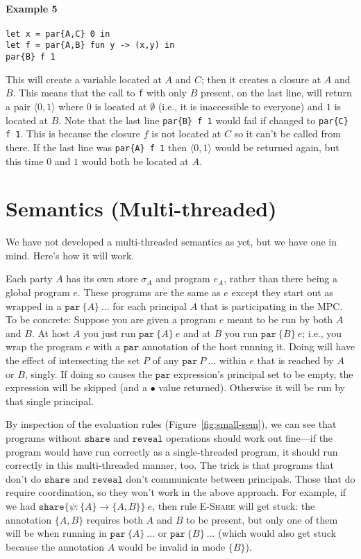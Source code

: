 \documentclass[10pt]{article}
\newcommand{\rulelab}[1]{{\small \textsc{#1}}}
\newcommand{\kw}[1]{\ensuremath{\mathtt{#1}}}
\newcommand{\epar}[2]{\ensuremath{\kw{par}~{#1}~{#2}}}
\newcommand{\eshare}[4]{\ensuremath{\kw{share}\{{#1}\!:\!{#2}\rightarrow{#3}\}~{#4}}}
\newcommand{\epair}[2]{\ensuremath{\langle {#1}, {#2} \rangle}}
\newcommand{\vcrash}{\ensuremath{\bullet}}
\newcommand{\env}{\ensuremath{\sigma}}
\begin{document}
\paragraph{Example 5}
\begin{verbatim}
let x = par{A,C} 0 in
let f = par{A,B} fun y -> (x,y) in
par{B} f 1
\end{verbatim}
This will create a variable located at $A$ and $C$; then it creates a
closure at $A$ and $B$. This means that the call to \texttt{f} with
only $B$ present, on the last line, will return a pair $\epair{0}{1}$
where $0$ is located at $\emptyset$ (i.e., it is inaccessible to
everyone) and $1$ is located at $B$. Note that the last line
\texttt{par\{B\} f 1} would fail if changed to \texttt{par\{C\} f
  1}. This is because the closure $f$ is not located at $C$ so it
can't be called from there. If the last line was \texttt{par\{A\} f 1}
then $\epair{0}{1}$ would be returned again, but this time $0$ and $1$
would both be located at $A$.

\section{Semantics (Multi-threaded)}
\label{sec:MTsemantics}

We have not developed a multi-threaded semantics as yet, but we have
one in mind. Here's how it will work.

Each party $A$ has its own store $\env_A$ and program $e_A$, rather
than there being a global program $e$. These programs are the same as
$e$ except they start out as wrapped in a $\epar{\{A\}}{...}$ for each
principal $A$ that is participating in the MPC\@. To be concrete:
Suppose you are given a program $e$
meant to be run by both $A$ and $B$. At host $A$ you just run
$\epar{\{A\}}{e}$ and at $B$ you run $\epar{\{B\}}{e}$; i.e., you wrap
the program $e$ with a $\kw{par}$ annotation of the host running
it. Doing will have the effect of intersecting the set $P$ of any
$\epar{P}{...}$ within $e$ that is reached by $A$ or $B$, singly. If
doing so causes the $\kw{par}$ expression's principal set to be empty,
the expression will be skipped (and a $\vcrash$ value
returned). Otherwise it will be run by that single principal.

By inspection of the evaluation rules (Figure~\ref{fig:small-sem}), we can
see that programs without $\kw{share}$ and $\kw{reveal}$ operations
should work out fine---if the program would have run correctly as a
single-threaded program, it should run correctly in this
multi-threaded manner, too. The trick is that programs that don't do
$\kw{share}$ and $\kw{reveal}$ don't communicate between
principals. Those that do require coordination, so they won't work in
the above approach. For example, if we had
$\eshare{\psi}{\{A\}}{\{A,B\}}{e}$, then rule \rulelab{E-Share} will
get stuck: the annotation $\{A,B\}$ requires both $A$ and $B$ to be
present, but only one of them will be when running in
$\epar{\{A\}}{...}$ or $\epar{\{B\}}{...}$ (which would also get stuck
because the annotation $A$ would be invalid in mode $\{B\}$).
\end{document}
